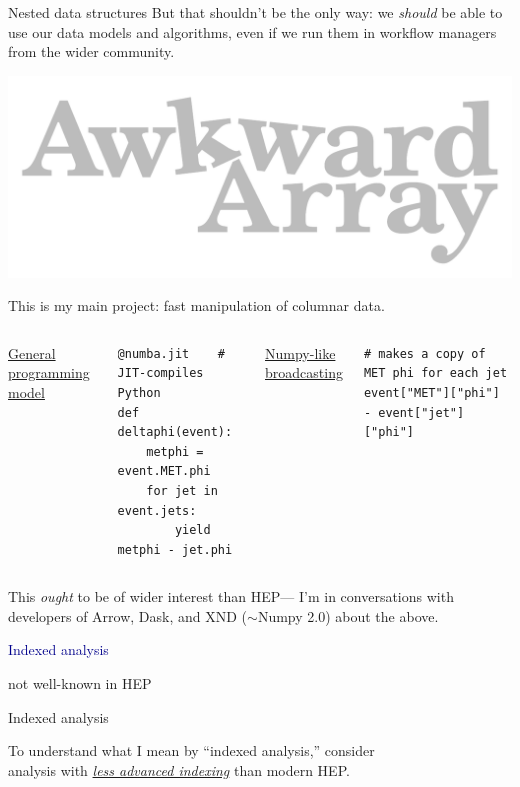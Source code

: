 \documentclass[aspectratio=169]{beamer}
\begin{document}
\begin{frame}[fragile]{Nested data structures}
\Large
\vspace{0.5 cm}
But that shouldn't be the only way: we {\it should} be able to use our data models and algorithms, even if we run them in workflow managers from the wider community.

\large
\vspace{0.5 cm}
\hfill \includegraphics[height=1 cm]{awkward-logo.pdf}

\vspace{-1 cm}
This is my main project: fast manipulation of columnar data.

\vspace{0.25 cm}
\scriptsize
\begin{columns}[t]
\underline{\large General programming model}

\begin{verbatim}
@numba.jit    # JIT-compiles Python
def deltaphi(event):
    metphi = event.MET.phi
    for jet in event.jets:
        yield metphi - jet.phi
\end{verbatim}

\underline{\large Numpy-like broadcasting}

\begin{verbatim}
# makes a copy of MET phi for each jet
event["MET"]["phi"] - event["jet"]["phi"]
\end{verbatim}
\end{columns}

\large
\vspace{0.5 cm}
This {\it ought} to be of wider interest than HEP--- I'm in conversations with developers of Arrow, Dask, and XND ($\sim$Numpy 2.0) about the above.
\end{frame}

\begin{frame}{}
\huge
\vspace{0.5 cm}
\begin{center}
\textcolor{darkblue}{Indexed analysis}

\large
\vspace{0.5 cm}
not well-known in HEP
\end{center}
\end{frame}

\begin{frame}{Indexed analysis}
\Large
\vspace{0.5 cm}
\begin{center}
To understand what I mean by ``indexed analysis,'' consider \\
analysis with \underline{\it less advanced indexing} than modern HEP.
\end{center}
\end{frame}
\end{document}
